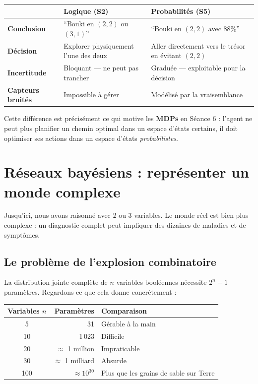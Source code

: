\documentclass[11pt,a4paper]{article}
\begin{document}
\begin{retenirbox}
\begin{center}
\begin{tabular}{lp{5cm}p{5cm}}
\toprule
& \textbf{Logique (S2)} & \textbf{Probabilités (S5)} \\
\midrule
\textbf{Conclusion} & ``Bouki en $(2,2)$ ou $(3,1)$'' & ``Bouki en $(2,2)$ avec 88\%'' \\
\textbf{Décision} & Explorer physiquement l'une des deux & Aller directement vers le trésor en évitant $(2,2)$ \\
\textbf{Incertitude} & Bloquant — ne peut pas trancher & Graduée — exploitable pour la décision \\
\textbf{Capteurs bruités} & Impossible à gérer & Modélisé par la vraisemblance \\
\bottomrule
\end{tabular}
\end{center}

Cette différence est précisément ce qui motive les \textbf{MDPs} en Séance 6 : l'agent ne peut plus planifier un chemin optimal dans un espace d'états certains, il doit optimiser ses actions dans un espace d'états \textit{probabilistes}.
\end{retenirbox}

\section{Réseaux bayésiens : représenter un monde complexe}

Jusqu'ici, nous avons raisonné avec 2 ou 3 variables. Le monde réel est bien plus complexe : un diagnostic complet peut impliquer des dizaines de maladies et de symptômes.

\subsection{Le problème de l'explosion combinatoire}

La distribution jointe complète de $n$ variables booléennes nécessite $2^n - 1$ paramètres. Regardons ce que cela donne concrètement :

\begin{center}
\begin{tabular}{crl}
\toprule
\textbf{Variables} $n$ & \textbf{Paramètres} & \textbf{Comparaison} \\
\midrule
5 & 31 & Gérable à la main \\
10 & 1\,023 & Difficile \\
20 & $\approx$ 1 million & Impraticable \\
30 & $\approx$ 1 milliard & Absurde \\
100 & $\approx 10^{30}$ & Plus que les grains de sable sur Terre \\
\bottomrule
\end{tabular}
\end{center}
\end{document}
